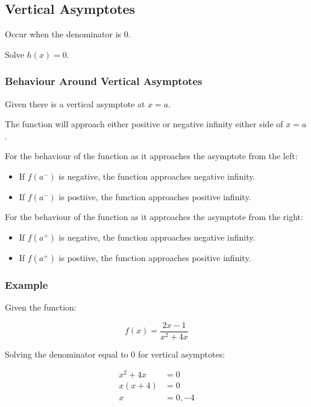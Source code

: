 \documentclass[a4paper,11pt]{article}
\begin{document}
\subsection{Vertical Asymptotes}

Occur when the denominator is 0.

Solve $h(x) = 0$.


\subsubsection{Behaviour Around Vertical Asymptotes}

Given there is a vertical asymptote at $x = a$.

The function will approach either positive or negative infinity either side of
$x = a$.

For the behaviour of the function as it approaches the asymptote from the left:

\begin{itemize}
\item If $f(a^-)$ is negative, the function approaches negative infinity.
\item If $f(a^-)$ is postiive, the function approaches positive infinity.
\end{itemize}

For the behaviour of the function as it approaches the asymptote from the right:

\begin{itemize}
\item If $f(a^+)$ is negative, the function approaches negative infinity.
\item If $f(a^+)$ is postiive, the function approaches positive infinity.
\end{itemize}


\subsubsection{Example}

Given the function:

$$
f(x) = \frac{2x - 1}{x^2 + 4x}
$$

Solving the denominator equal to 0 for vertical asymptotes:

$$
\begin{aligned}
x^2 + 4x & = 0 \\
x(x + 4) & = 0 \\
x & = 0, -4 \\
\end{aligned}
$$
\end{document}
